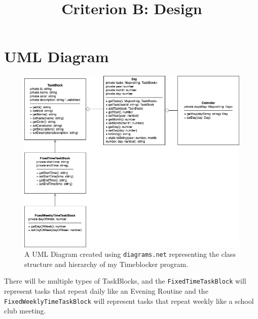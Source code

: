 \documentclass[12pt]{report}
\title{Criterion B: Design}
\begin{document}
\centerline{\textcolor{msblue}{
		\textbf{\fontsize{13}{13}\MyTitle}
	}}

\section*{UML Diagram}
\begin{figure}[H]
	\caption{A UML Diagram created using \texttt{diagrams.net} representing the class structure and hierarchy of my Timeblocker program.}
	\includegraphics[width=\textwidth]{uml-diagram.png}
\end{figure}

There will be multiple types of TaskBlocks, and the \texttt{FixedTimeTaskBlock} will represent tasks that repeat daily like an Evening Routine and the \texttt{FixedWeeklyTimeTaskBlock} will represent tasks that repeat weekly like a school club meeting.
\end{document}
